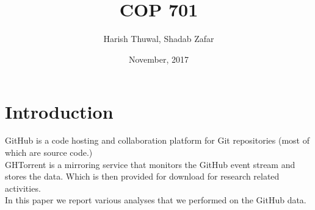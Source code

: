 \documentclass{article}
\title{
  \bold{Final Project Report} \\
  \large COP 701
}
\author{
    Harish Thuwal, Shadab Zafar
}
\date{November, 2017}
\begin{document}
\maketitle

\vspace{15px}
\tableofcontents

\newpage
\section{Introduction}

GitHub is a code hosting and collaboration platform for Git repositories
(most of which are source code.) \\

GHTorrent is a mirroring service that monitors the GitHub event stream and
stores the data. Which is then provided for download for research related
activities. \\

In this paper we report various analyses that we performed on the GitHub data.
\end{document}
